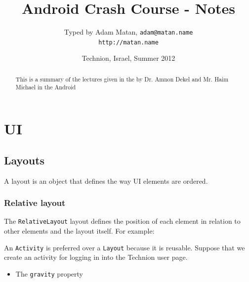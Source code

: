 \documentclass{article}
\begin{document}
\def\codefont{
\fontspec{Courier New}
  \fontsize{9pt}{11pt}\selectfont}
\newenvironment{code}
{\begin{center}
    \begin{tikzpicture}
      \node [fill=codebgcolor,rounded corners=5pt]
      \bgroup
      \bgroup\codefont
      \begin{tabular}{l}}
      {\end{tabular}
      \egroup
      \egroup;
    \end{tikzpicture}
  \end{center}}


\title{Android Crash Course - Notes}
\author{Typed by Adam Matan, \texttt{adam@matan.name} \\
\texttt{http://matan.name}}
\date{Technion, Israel, Summer 2012}

\maketitle

\begin{abstract}
This is a summary of the 
 lectures given in the by Dr. Amnon Dekel and Mr. Haim Michael in the Android
\end{abstract}

\tableofcontents

\section{UI}
\subsection{Layouts}
A layout is an object that defines the way UI elements are ordered.

\subsubsection{Relative layout}

The \texttt{RelativeLayout} layout defines the position of each element in relation to other elements and the layout itself. For example:

An \texttt{Activity} is preferred over a \texttt{Layout} because it is reusable. Suppose that we create an activity for logging in into the Technion user page. 

\begin{itemize}
\item The \texttt{gravity} property
\end{itemize}
\end{document}
